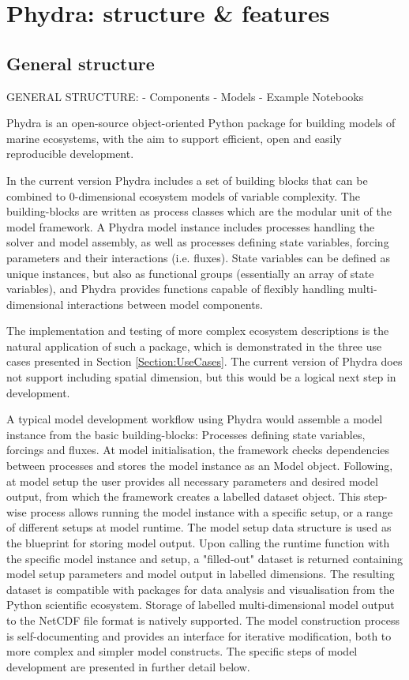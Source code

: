 \documentclass[journal abbreviation, manuscript]{copernicus}
\begin{document}
\section{Phydra: structure \& features} \label{Section:phydrapackage}

\subsection{General structure}
GENERAL STRUCTURE:
- Components
- Models
- Example Notebooks


Phydra is an open-source object-oriented Python package for building models of marine ecosystems, with the aim to support efficient, open and easily reproducible development. 

In the current version Phydra includes a set of building blocks that can be combined to 0-dimensional ecosystem models of variable complexity. The building-blocks are written as process classes which are the modular unit of the model framework. 
A Phydra model instance includes processes handling the solver and model assembly, as well as processes defining state variables, forcing parameters and their interactions (i.e. fluxes). State variables can be defined as unique instances, but also as functional groups (essentially an array of state variables), and Phydra provides functions capable of flexibly handling multi-dimensional interactions between model components. 

The implementation and testing of more complex ecosystem descriptions is the natural application of such a package, which is demonstrated in the three use cases presented in Section \ref{Section:UseCases}. The current version of Phydra does not support including spatial dimension, but this would be a logical next step in development.

A typical model development workflow using Phydra would assemble a model instance from the basic building-blocks: Processes defining state variables, forcings and fluxes. At model initialisation, the framework checks dependencies between processes and stores the model instance as an Model object. Following, at model setup the user provides all necessary parameters and desired model output, from which the framework creates a labelled dataset object. This step-wise process allows running the model instance with a specific setup, or a range of different setups at model runtime. The model setup data structure is used as the blueprint for storing model output. Upon calling the runtime function with the specific model instance and setup, a "filled-out" dataset is returned containing model setup parameters and model output in labelled dimensions. The resulting dataset is compatible with packages for data analysis and visualisation from the Python scientific ecosystem. Storage of labelled multi-dimensional model output to the NetCDF file format is natively supported.
The model construction process is self-documenting and provides an interface for iterative modification, both to more complex and simpler model constructs. The specific steps of model development are presented in further detail below.
\end{document}
